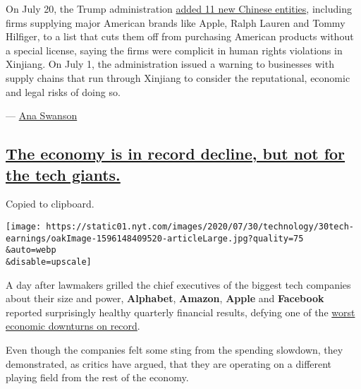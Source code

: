 On July 20, the Trump administration
\href{https://www.nytimes.com/2020/07/20/business/economy/china-sanctions-uighurs-labor.html}{added
11 new Chinese entities}, including firms supplying major American
brands like Apple, Ralph Lauren and Tommy Hilfiger, to a list that cuts
them off from purchasing American products without a special license,
saying the firms were complicit in human rights violations in Xinjiang.
On July 1, the administration issued a warning to businesses with supply
chains that run through Xinjiang to consider the reputational, economic
and legal risks of doing so.

--- \href{https://www.nytimes.com/by/ana-swanson}{Ana Swanson}

\hypertarget{the-economy-is-in-record-decline-but-not-for-the-tech-giants}{%
\subsection{\texorpdfstring{\protect\hyperlink{the-economy-is-in-record-decline-but-not-for-the-tech-giants}{The
economy is in record decline, but not for the tech
giants.}}{The economy is in record decline, but not for the tech giants.}}\label{the-economy-is-in-record-decline-but-not-for-the-tech-giants}}

Copied to clipboard.

\texttt{[image: https://static01.nyt.com/images/2020/07/30/technology/30tech-earnings/oakImage-1596148409520-articleLarge.jpg?quality=75\\\&auto=webp\\\&disable=upscale]}

A day after lawmakers grilled the chief executives of the biggest tech
companies about their size and power, \textbf{Alphabet},
\textbf{Amazon}, \textbf{Apple} and \textbf{Facebook} reported
surprisingly healthy quarterly financial results, defying one of the
\href{https://www.nytimes.com/live/2020/07/30/business/stock-market-today-coronavirus/the-us-economys-contraction-in-the-second-quarter-was-the-worst-on-record}{worst
economic downturns on record}.

Even though the companies felt some sting from the spending slowdown,
they demonstrated, as critics have argued, that they are operating on a
different playing field from the rest of the economy.


